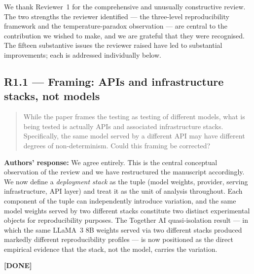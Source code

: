 \documentclass[11pt,a4paper]{article}
\newenvironment{revquote}{%
  \begin{quote}\small\itshape\color{revgray}
}{%
  \end{quote}
}
\newcommand{\response}[1]{\par\noindent\textbf{\color{revgreen}Authors' response:} #1\par}
\newcommand{\done}{\color{revgreen}\textbf{[DONE]}}
\begin{document}
We thank Reviewer~1 for the comprehensive and unusually constructive review. The two strengths the reviewer identified --- the three-level reproducibility framework and the temperature-paradox observation --- are central to the contribution we wished to make, and we are grateful that they were recognised. The fifteen substantive issues the reviewer raised have led to substantial improvements; each is addressed individually below.

\subsection*{R1.1 --- Framing: APIs and infrastructure stacks, not models}

\begin{revquote}
While the paper frames the testing as testing of different models, what is being tested is actually APIs and associated infrastructure stacks. Specifically, the same model served by a different API may have different degrees of non-determinism. Could this framing be corrected?
\end{revquote}

\response{We agree entirely. This is the central conceptual observation of the review and we have restructured the manuscript accordingly. We now define a \emph{deployment stack} as the tuple (model weights, provider, serving infrastructure, API layer) and treat it as the unit of analysis throughout. Each component of the tuple can independently introduce variation, and the same model weights served by two different stacks constitute two distinct experimental objects for reproducibility purposes. The Together AI quasi-isolation result --- in which the same LLaMA~3 8B weights served via two different stacks produced markedly different reproducibility profiles --- is now positioned as the direct empirical evidence that the stack, not the model, carries the variation.} \done
\end{document}

